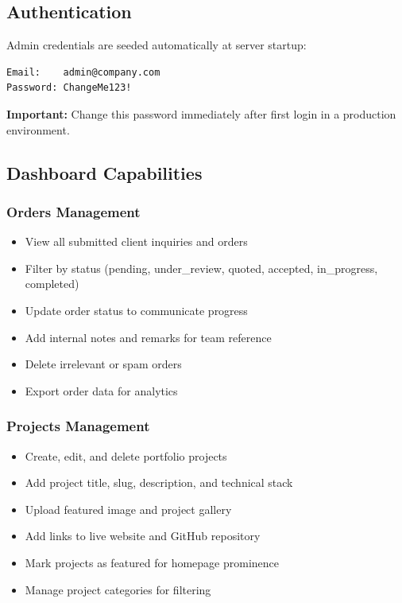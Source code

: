 \documentclass[12pt]{article}
\begin{document}
\subsection{Authentication}

Admin credentials are seeded automatically at server startup:

\begin{lstlisting}
Email:    admin@company.com
Password: ChangeMe123!
\end{lstlisting}

\textbf{Important:} Change this password immediately after first login in a production environment.

\subsection{Dashboard Capabilities}

\subsubsection{Orders Management}
\begin{itemize}
  \item View all submitted client inquiries and orders
  \item Filter by status (pending, under\_review, quoted, accepted, in\_progress, completed)
  \item Update order status to communicate progress
  \item Add internal notes and remarks for team reference
  \item Delete irrelevant or spam orders
  \item Export order data for analytics
\end{itemize}

\subsubsection{Projects Management}
\begin{itemize}
  \item Create, edit, and delete portfolio projects
  \item Add project title, slug, description, and technical stack
  \item Upload featured image and project gallery
  \item Add links to live website and GitHub repository
  \item Mark projects as featured for homepage prominence
  \item Manage project categories for filtering
\end{itemize}
\end{document}
